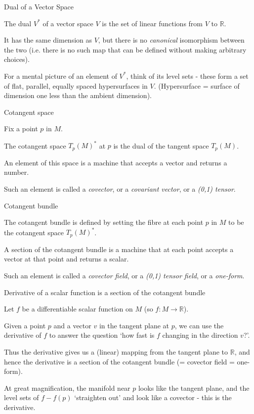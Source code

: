 \documentclass{beamer}
\begin{document}
\begin{frame}{Dual of a Vector Space}

The dual $V^*$ of a vector space $V$ is the set of linear functions from $V$ to $\mathbb{R}$.

It has the same dimension as $V$, but there is no \textit{canonical} isomorphism between the two (i.e. there is no such map that can be defined without making arbitrary choices).

For a mental picture of an element of $V^*$, think of its level sets - these form a set of flat, parallel, equally spaced hypersurfaces in $V$. (Hypersurface = surface of dimension one less than the ambient dimension).

\end{frame}

\begin{frame}{Cotangent space}

Fix a point $p$ in $M$.

The cotangent space $T_p(M)^*$ at $p$ is the dual of the tangent space $T_p(M)$.

An element of this space is a machine that accepts a vector and returns a number.

Such an element is called a \textit{covector}, or a \textit{covariant vector}, or a \textit{(0,1) tensor}.


\end{frame}


\begin{frame}{Cotangent bundle}

The cotangent bundle is defined by setting the fibre at each point $p$ in $M$ to be the cotangent space $T_p(M)^*$.

A section of the cotangent bundle is a machine that at each point accepts a vector at that point and returns a scalar.

Such an element is called a \textit{covector field}, or a \textit{(0,1) tensor field}, or a \textit{one-form}.

\end{frame}

\begin{frame}{Derivative of a scalar function is a section of the cotangent bundle}

Let $f$ be a differentiable scalar function on $M$ (so $f \colon M \to \mathbb{R}$).

Given a point $p$ and a vector $v$ in the tangent plane at $p$, we can use the derivative of $f$ to answer the question `how fast is $f$ changing in the direction $v$?'.

Thus the derivative gives us a (linear) mapping from the tangent plane to $\mathbb{R}$, and hence the derivative is a section of the cotangent bundle (= covector field = one-form).

At great magnification, the manifold near $p$ looks like the tangent plane, and the level sets of $f-f(p)$ `straighten out' and look like a covector - this is the derivative.

\end{frame}
\end{document}
